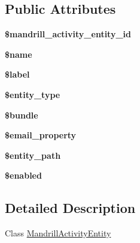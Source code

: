 \subsection*{Public Attributes}
\begin{DoxyCompactItemize}
\item 
\hypertarget{classMandrillActivityEntity_a91b663251eb071cb5111f5438851b906}{
{\bfseries \$mandrill\_\-activity\_\-entity\_\-id}}
\label{classMandrillActivityEntity_a91b663251eb071cb5111f5438851b906}

\item 
\hypertarget{classMandrillActivityEntity_a59424d0a4c36ef598691ec5140ec037c}{
{\bfseries \$name}}
\label{classMandrillActivityEntity_a59424d0a4c36ef598691ec5140ec037c}

\item 
\hypertarget{classMandrillActivityEntity_adf45f0148999c5125f40fdb9edb5d7ca}{
{\bfseries \$label}}
\label{classMandrillActivityEntity_adf45f0148999c5125f40fdb9edb5d7ca}

\item 
\hypertarget{classMandrillActivityEntity_ae4974032488556e854b911e775e27e38}{
{\bfseries \$entity\_\-type}}
\label{classMandrillActivityEntity_ae4974032488556e854b911e775e27e38}

\item 
\hypertarget{classMandrillActivityEntity_acca22da789d51cbac4a0ef969f53d26b}{
{\bfseries \$bundle}}
\label{classMandrillActivityEntity_acca22da789d51cbac4a0ef969f53d26b}

\item 
\hypertarget{classMandrillActivityEntity_a1014c7ffef3171e97223750597f08bf8}{
{\bfseries \$email\_\-property}}
\label{classMandrillActivityEntity_a1014c7ffef3171e97223750597f08bf8}

\item 
\hypertarget{classMandrillActivityEntity_a985a2be8970c4760021f0d0abc86863d}{
{\bfseries \$entity\_\-path}}
\label{classMandrillActivityEntity_a985a2be8970c4760021f0d0abc86863d}

\item 
\hypertarget{classMandrillActivityEntity_a4d95c315e7448f987397e6e48f21e5b1}{
{\bfseries \$enabled}}
\label{classMandrillActivityEntity_a4d95c315e7448f987397e6e48f21e5b1}

\end{DoxyCompactItemize}


\subsection{Detailed Description}
Class \hyperlink{classMandrillActivityEntity}{MandrillActivityEntity}


